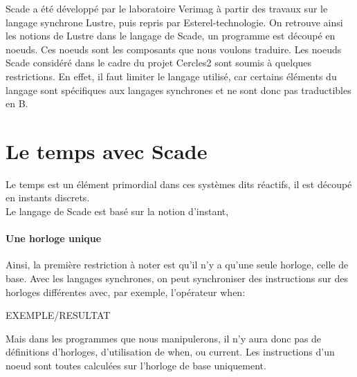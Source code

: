 


Scade a été développé par le laboratoire Verimag à partir des travaux sur
le langage synchrone Lustre, puis repris par Esterel-technologie. On retrouve
ainsi les notions de Lustre dans le langage de Scade, un programme est découpé
en noeuds. Ces noeuds sont les composants que nous voulons traduire.
Les noeuds Scade considéré dans le cadre du projet Cercles2 sont
soumis à quelques restrictions. En effet, il faut limiter le langage
utilisé, car certains éléments du langage sont spécifiques aux
langages synchrones et ne sont donc pas traductibles en B.\\



\section{Le temps avec Scade}

Le temps est un élément primordial dans ces systèmes dits réactifs, il est
découpé en instants discrets.\\ 
Le langage de Scade est basé sur la notion d'instant, 

\paragraph{Une horloge unique}
Ainsi, la première restriction à noter est qu'il n'y a qu'une seule
horloge, celle de base. Avec les langages synchrones, on peut
synchroniser des instructions sur des horloges différentes avec, par
exemple, l'opérateur when:

EXEMPLE/RESULTAT

Mais dans les programmes que nous manipulerons, il n'y aura donc pas
de définitions d'horloges, d'utilisation de when, ou current. Les
instructions d'un noeud sont toutes calculées sur l'horloge de base
uniquement.



